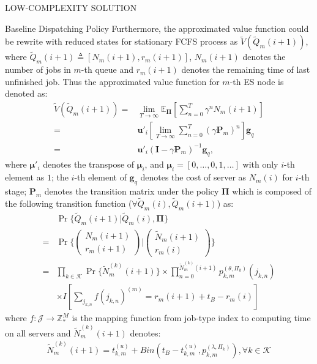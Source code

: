 \documentclass[10pt, conference, letterpaper]{IEEEtran}
\newcommand{\domZ}{\mathbb{Z}_{*}}
\newcommand{\mat}{\mathbf}
\newcommand{\define}{\triangleq}
\renewcommand{\vec}{\mathbf}
\newcommand{\apSet}{\mathcal{K}}
\newcommand{\jSpace}{\mathcal{J}}
\begin{document}
\begin{section}{LOW-COMPLEXITY SOLUTION}
\begin{subsection}{Baseline Dispatching Policy}
            Furthermore, the approximated value function could be rewrite with reduced states for stationary FCFS process as $\tilde{V}(\tilde{Q}_m(i+1))$, where $\tilde{Q}_m(i+1) \define [N_m(i+1), r_m(i+1)]$, $N_m(i+1)$ denotes the number of jobs in $m$-th queue and $r_m(i+1)$ denotes the remaining time of last unfinished job. Thus the approximated value function for $m$-th ES node is denoted as:
            \begin{align}
                \tilde{V}(\tilde{Q}_m(i+1)) =& \lim_{T\to\infty} \mathbb{E}_{\vec{\Pi}} [\sum_{n=0}^{T} \gamma^{n} N_m(i+1)]
                \nonumber\\
                =& \vec{u}'_i [\lim_{T\to\infty} \sum_{n=0}^{T} (\gamma \mat{P}_m)^{n}] \vec{g}_q
                \nonumber\\
                =& \vec{u}'_i (\mat{I} - \gamma \mat{P}_m)^{-1} \vec{g}_q,
            \end{align}
            where $\vec{\mu}'_i$ denotes the transpose of $\vec{\mu}_i$, and $\vec{\mu}_i = [0,\dots,0,1,\dots]$ with only $i$-th element as $1$; the $i$-th element of $\vec{g}_q$ denotes the cost of server as $N_m(i)$ for $i$-th stage; $\mat{P}_m$ denotes the transition matrix under the policy $\vec{\Pi}$ which is composed of the following transition function ($\forall \tilde{Q}_m(i),\tilde{Q}_m(i+1)$) as:
            \begin{align}
                & \Pr\{\tilde{Q}_m(i+1)|\tilde{Q}_m(i),\vec{\Pi}\}
                \nonumber\\
                =& \Pr\{\begin{pmatrix}
                    N_m(i+1) \\ r_m(i+1)
                \end{pmatrix}|\begin{pmatrix}
                    \tilde{N}_m(i+1) \\ r_m(i)
                \end{pmatrix}\}
                \nonumber\\
                =& \prod_{k\in\apSet} \Pr\{\tilde{N}^{(k)}_m(i+1)\} \times \prod_{n=0}^{\tilde{N}^{(k)}_m(i+1)} p^{(\theta,\Pi_k)}_{k,m}(j_{k,n})
                \nonumber\\
                &\times I[\sum_{j_{k,n}} f(j_{k,n})^{(m)} = r_m(i+1)+t_B-r_m(i)]
            \end{align}
            where $f:\jSpace \to \domZ^M$ is the mapping function from job-type index to computing time on all servers and $\tilde{N}^{(k)}_m(i+1)$ denotes:
            \begin{gather}
                \tilde{N}^{(k)}_m(i+1) = t^{(u)}_{k,m} + Bin(t_B-t^{(u)}_{k,m}, p^{(\lambda, \Pi_k)}_{k,m}), \forall k\in\apSet
            \end{gather}
        \end{subsection}


\end{section}
\end{document}

